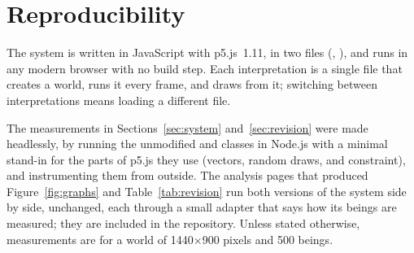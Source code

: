 \section{Reproducibility}
\label{app:reproducibility}

The system is written in JavaScript with p5.js~1.11, in two files (, ), and runs in any modern browser with no build step. Each interpretation is a single file that creates a world, runs it every frame, and draws from it; switching between interpretations means loading a different file.

The measurements in Sections~\ref{sec:system} and~\ref{sec:revision} were made headlessly, by running the unmodified  and  classes in Node.js with a minimal stand-in for the parts of p5.js they use (vectors, random draws, and constraint), and instrumenting them from outside. The analysis pages that produced Figure~\ref{fig:graphs} and Table~\ref{tab:revision} run both versions of the system side by side, unchanged, each through a small adapter that says how its beings are measured; they are included in the repository. Unless stated otherwise, measurements are for a world of 1440$\times$900 pixels and 500 beings.
